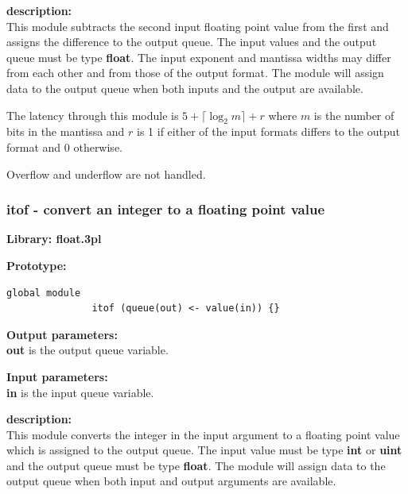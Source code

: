             {\bf description:} \\
            This module subtracts the second input floating point value
            from the first and assigns the difference to the output queue.
            The input values and the output queue must be type {\bf float}.
            The input exponent and mantissa widths may differ from each other
            and from those of the output format.
            The module will assign data to the output queue when both
            inputs and the output are available.
            
            The latency through this module is $5 + \lceil \log_2 m \rceil + r$
            where $m$ is the number of bits in the mantissa and $r$ is 1 if
            either of the input formats differs to the output format and 0
            otherwise.
            
            Overflow and underflow are not handled.


        \subsubsection{itof - convert an integer to a floating point value}\label{sec:lmitof}

            {\bf Library: float.3pl}

            {\bf Prototype:} \\
            \vsp
            \begin{lstlisting}[gobble=12, language=threepl]
               global module
               itof (queue(out) <- value(in)) {}
            \end{lstlisting}

            {\bf Output parameters:} \\
            {\bf out} is the output queue variable.

            {\bf Input parameters:} \\
            {\bf in} is the input queue variable.

            {\bf description:} \\
            This module converts the integer in the input argument to a floating
            point value which is assigned to the output queue.
            The input value must be type {\bf int} or {\bf uint} and the
            output queue must be type {\bf float}.
            The module will assign data to the output queue when both
            input and output arguments are available.
            
